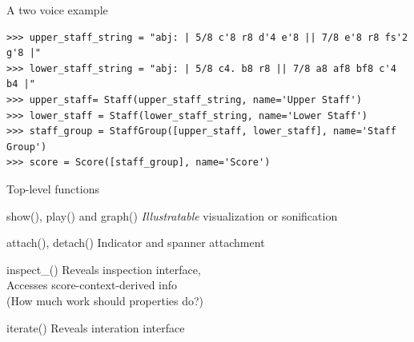 \begin{frame}[fragile]{A two voice example}

\begin{abjadbookoutput}
\begin{singlespacing}
\vspace{-0.5\baselineskip}
\begin{verbatim}
>>> upper_staff_string = "abj: | 5/8 c'8 r8 d'4 e'8 || 7/8 e'8 r8 fs'2 g'8 |"
>>> lower_staff_string = "abj: | 5/8 c4. b8 r8 || 7/8 a8 af8 bf8 c'4 b4 |"
>>> upper_staff= Staff(upper_staff_string, name='Upper Staff')
>>> lower_staff = Staff(lower_staff_string, name='Lower Staff')
>>> staff_group = StaffGroup([upper_staff, lower_staff], name='Staff Group')
>>> score = Score([staff_group], name='Score')
\end{verbatim}
\end{singlespacing}
\end{abjadbookoutput}

\end{frame}

\begin{frame}[fragile]{Top-level functions}
    \begin{block}{show(), play() and graph()}
        \emph{Illustratable} visualization or sonification
    \end{block}
    \begin{block}{attach(), detach()}
        Indicator and spanner attachment
    \end{block}
    \begin{block}{inspect\_()}
        Reveals inspection interface,\\
        Accesses score-context-derived info\\
        (How much work should properties do?)
    \end{block}
    \begin{block}{iterate()}
        Reveals interation interface
    \end{block}
\end{frame}


